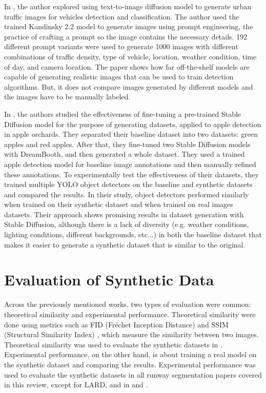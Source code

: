 In \cite{reutov_generating_2023}, the author explored using text-to-image diffusion model to generate urban traffic images for vehicles detection and classification. The author used the trained Kandinsky 2.2 model to generate images using prompt engineering, the practice of crafting a prompt so the image contains the necessary details. 192 different prompt variants were used to generate 1000 images with different combinations of traffic density, type of vehicle, location, weather condition, time of day, and camera location. The paper shows how far off-the-shelf models are capable of generating realistic images that can be used to train detection algorithms. But, it does not compare images generated by different models and the images have to be manually labeled. 

In \cite{voetman_big_2023}, the authors studied the effectiveness of fine-tuning a pre-trained Stable Diffusion model for the purpose of generating datasets, applied to apple detection in apple orchards. They separated their baseline dataset into two datasets: green apples and red apples. After that, they fine-tuned two Stable Diffusion models with DreamBooth, and then generated a whole dataset. They used a trained apple detection model for baseline image annotations and then manually refined these annotations. To experimentally test the effectiveness of their datasets, they trained multiple YOLO object detectors on the baseline and synthetic datasets and compared the results. In their study, object detectors performed similarly when trained on their synthetic dataset and when trained on real images datasets. Their approach shows promising results in dataset generation with Stable Diffusion, although there is a lack of diversity (e.g. weather conditions, lighting conditions, different backgrounds, etc...) in both the baseline dataset that makes it easier to generate a synthetic dataset that is similar to the original.

\section{Evaluation of Synthetic Data}

Across the previously mentioned works, two types of evaluation were common: theoretical similarity and experimental performance. Theoretical similarity were done using metrics such as FID (Fréchet Inception Distance) \cite{heusel_gans_2017} and SSIM (Structural Similarity Index) \cite{wang_image_2004}, which measure the similarity between two images. Theoretical similarity was used to evaluate the synthetic datasets in \cite{saragih_using_2024}. Experimental performance, on the other hand, is about training a real model on the synthetic dataset and comparing the results. Experimental performance was used to evaluate the synthetic datasets in all runway segmentation papers covered in this review, except for LARD, and in \cite{reutov_generating_2023} and \cite{voetman_big_2023}.

